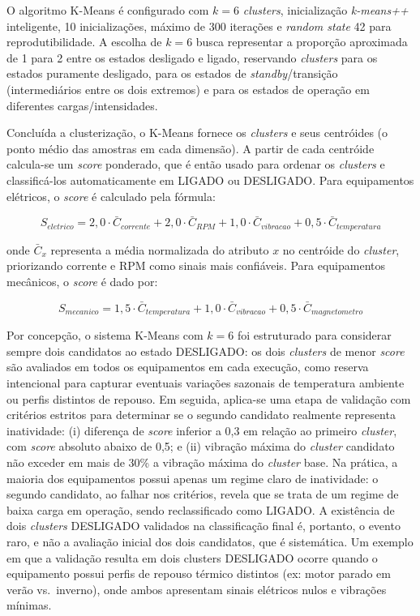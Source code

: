 O algoritmo K-Means é configurado com $k=6$ \textit{clusters}, inicialização \textit{k-means++} inteligente, 10 inicializações, máximo de 300 iterações e \textit{random state} 42 para reprodutibilidade. A escolha de $k=6$ busca representar a proporção aproximada de 1 para 2 entre os estados desligado e ligado, reservando \textit{clusters} para os estados puramente desligado, para os estados de \textit{standby}/transição (intermediários entre os dois extremos) e para os estados de operação em diferentes cargas/intensidades.

Concluída a clusterização, o K-Means fornece os \textit{clusters} e seus centróides (o ponto médio das amostras em cada dimensão). A partir de cada centróide calcula-se um \textit{score} ponderado, que é então usado para ordenar os \textit{clusters} e classificá-los automaticamente em LIGADO ou DESLIGADO. Para equipamentos elétricos, o \textit{score} é calculado pela fórmula:

\begin{equation}
    S_{eletrico} = 2{,}0 \cdot \bar{C}_{corrente} + 2{,}0 \cdot \bar{C}_{RPM} + 1{,}0 \cdot \bar{C}_{vibracao} + 0{,}5 \cdot \bar{C}_{temperatura}
    \label{eq:score_eletrico}
\end{equation}

\noindent onde $\bar{C}_{x}$ representa a média normalizada do atributo $x$ no centróide do \textit{cluster}, priorizando corrente e RPM como sinais mais confiáveis. Para equipamentos mecânicos, o \textit{score} é dado por:

\begin{equation}
    S_{mecanico} = 1{,}5 \cdot \bar{C}_{temperatura} + 1{,}0 \cdot \bar{C}_{vibracao} + 0{,}5 \cdot \bar{C}_{magnetometro}
    \label{eq:score_mecanico}
\end{equation}

Por concepção, o sistema K-Means com $k=6$ foi estruturado para considerar sempre dois candidatos ao estado DESLIGADO: os dois \textit{clusters} de menor \textit{score} são avaliados em todos os equipamentos em cada execução, como reserva intencional para capturar eventuais variações sazonais de temperatura ambiente ou perfis distintos de repouso. Em seguida, aplica-se uma etapa de validação com critérios estritos para determinar se o segundo candidato realmente representa inatividade: (i) diferença de \textit{score} inferior a 0,3 em relação ao primeiro \textit{cluster}, com \textit{score} absoluto abaixo de 0,5; e (ii) vibração máxima do \textit{cluster} candidato não exceder em mais de 30\% a vibração máxima do \textit{cluster} base. Na prática, a maioria dos equipamentos possui apenas um regime claro de inatividade: o segundo candidato, ao falhar nos critérios, revela que se trata de um regime de baixa carga em operação, sendo reclassificado como LIGADO. A existência de dois \textit{clusters} DESLIGADO validados na classificação final é, portanto, o evento raro, e não a avaliação inicial dos dois candidatos, que é sistemática. Um exemplo em que a validação resulta em dois clusters DESLIGADO ocorre quando o equipamento possui perfis de repouso térmico distintos (ex: motor parado em verão vs.\ inverno), onde ambos apresentam sinais elétricos nulos e vibrações mínimas.

